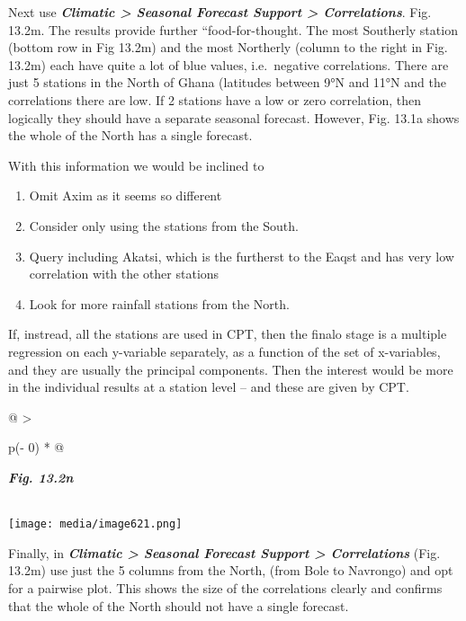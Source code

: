 \documentclass[
  letterpaper,
  DIV=11,
  numbers=noendperiod]{scrreprt}
\begin{document}
Next use \textbf{\emph{Climatic \textgreater{} Seasonal Forecast Support
\textgreater{} Correlations}}. Fig. 13.2m. The results provide further
``food-for-thought. The most Southerly station (bottom row in Fig 13.2m)
and the most Northerly (column to the right in Fig. 13.2m) each have
quite a lot of blue values, i.e.~negative correlations. There are just 5
stations in the North of Ghana (latitudes between 9°N and 11°N and the
correlations there are low. If 2 stations have a low or zero
correlation, then logically they should have a separate seasonal
forecast. However, Fig. 13.1a shows the whole of the North has a single
forecast.

With this information we would be inclined to

\begin{enumerate}
\def\labelenumi{\alph{enumi})}
\item
  Omit Axim as it seems so different
\item
  Consider only using the stations from the South.
\item
  Query including Akatsi, which is the furtherst to the Eaqst and has
  very low correlation with the other stations
\item
  Look for more rainfall stations from the North.
\end{enumerate}

If, instread, all the stations are used in CPT, then the finalo stage is
a multiple regression on each y-variable separately, as a function of
the set of x-variables, and they are usually the principal components.
Then the interest would be more in the individual results at a station
level -- and these are given by CPT.

\begin{longtable}[]{@{}
  >{\raggedright\arraybackslash}p{(\columnwidth - 0\tabcolsep) * }@{}}
\toprule\noalign{}
\begin{minipage}[b]{\linewidth}\raggedright
\textbf{\emph{Fig. 13.2n}}
\end{minipage} \\
\midrule\noalign{}
\endhead
\bottomrule\noalign{}
\endlastfoot
\texttt{[image: media/image621.png]} \\
\end{longtable}

Finally, in \textbf{\emph{Climatic \textgreater{} Seasonal Forecast
Support \textgreater{} Correlations}} (Fig. 13.2m) use just the 5
columns from the North, (from Bole to Navrongo) and opt for a pairwise
plot. This shows the size of the correlations clearly and confirms that
the whole of the North should not have a single forecast.
\end{document}
